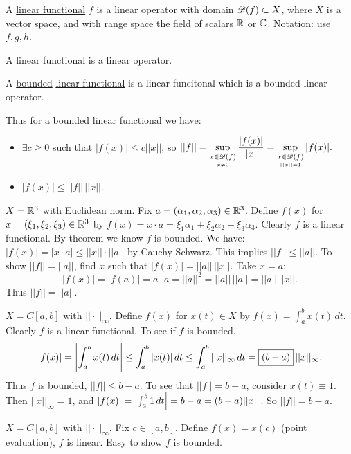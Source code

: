 \documentclass[]{article}
\begin{document}
\begin{definition}
	A \ul{linear functional} $f$ is a linear operator with domain $\mathscr{D}(f)\subset X$, where $X$ is a vector space, and with range space the field of scalars $\mathbb{R}$ or $\mathbb{C}$.
	Notation: use $f,g,h$.
\end{definition}
\begin{note}
	A linear functional is a linear operator.
\end{note}
\begin{definition}
	A \ul{bounded} \ul{linear functional} is a linear funcitonal which is a bounded linear operator.
\end{definition}
	Thus for a bounded linear functional we have:
\begin{itemize}
	\item $\exists c\geq 0$ such that $|f(x)|\leq c||x||$,
		so $\displaystyle ||f|| = \sup_{\underset{x\neq0}{x\in\mathscr{D}(f)}} \frac{|f(x)|}{||x||}
		= \sup_{\underset{||x||=1}{x\in\mathscr{D}(f)}} |f(x)|. $
		\item $|f(x)| \leq ||f||\,||x||$.
\end{itemize}
\begin{example}
	$X=\mathbb{R}^3$ with Euclidean norm. Fix $a=(\alpha_1,\alpha_2,\alpha_3)\in\mathbb{R}^3$.
	Define $f(x)$ for $x=(\xi_1,\xi_2,\xi_3)\in\mathbb{R}^3$ by $f(x) = x\cdot a = \xi_1\alpha_1+\xi_2\alpha_2+\xi_3\alpha_3$.
	Clearly $f$ is a linear functional.
	By theorem we know $f$ is bounded. We have: $|f(x)|=|x\cdot a|\leq ||x||\cdot||a||$ by Cauchy-Schwarz.
	This implies $||f||\leq||a||$. To show $||f||=||a||$, find $x$ such that $|f(x)|=||a||\,||x||$.
	Take $x=a$: $$|f(x)|=|f(a)| = a\cdot a = ||a||^2 = ||a||\,||a|| = ||a||\,||x||.$$
	Thus $||f||=||a||$.
\end{example}
\begin{example}
	$X= C[a,b]$ with $||\cdot||_\infty$. Define $f(x)$ for $x(t)\in X$ by $f(x) = \int_a^bx(t)\,dt$.
	Clearly $f$ is a linear functional.
	To see if $f$ is bounded,
	\begin{align*}
		|f(x)| = \left|\int_a^bx(t)\,dt\right|
			   \leq \int_a^b|x(t)|\,dt
			   \leq \int_a^b||x||_\infty\,dt
			   = \fbox{$(b-a)$}\,||x||_\infty.
	\end{align*}
	Thus $f$ is bounded, $||f||\leq b-a$.
	To see that $||f||=b-a$, consider $x(t)\equiv 1$.
	Then $||x||_\infty=1$, and $|f(x)| = \left|\int_a^b1\,dt\right| = b-a = (b-a)||x||$.
	So $||f||=b-a$.
\end{example}
\begin{example}
	$X = C[a,b]$ with $||\cdot||_\infty$. Fix $c\in[a,b]$.
	Define $f(x) = x(c)$ (point evaluation), $f$ is linear. Easy to show $f$ is bounded.
\end{example}
\end{document}
